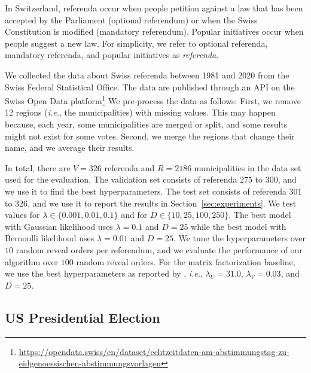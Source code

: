In Switzerland, referenda occur when  people petition against a law that has been accepted by the Parliament (optional referendum) or when the Swiss Constitution is modified (mandatory referendum).
Popular initiatives occur when  people suggest a new law.
For simplicity, we refer to optional referenda, mandatory referenda, and popular initiatives as \textit{referenda}.

We collected the data about Swiss referenda between 1981 and 2020 from the Swiss Federal Statistical Office.
The data are published through an API on the Swiss Open Data platform\footnote{\url{https://opendata.swiss/en/dataset/echtzeitdaten-am-abstimmungstag-zu-eidgenoessischen-abstimmungsvorlagen}}
We pre-process the data as follows:
First, we remove 12 regions (\textit{i.e.}, the municipalities) with missing values.
This may happen because, each year, some municipalities are merged or split, and some results might not exist for some votes.
Second, we merge the regions that change their name, and we average their results.

In total, there are $V=326$ referenda and $R=2186$ municipalities in the data set used for the evaluation.
The validation set consists of referenda $275$ to $300$, and we use it to find the best hyperparameters.
The test set consists of referenda $301$ to $326$, and we use it to report the results in Section~\ref{sec:experiments}.
We test values for $\lambda \in \{0.001, 0.01, 0.1\}$ and for $D \in \{10, 25, 100, 250\}$.
The best model with Gaussian likelihood uses $\lambda=0.1$ and $D=25$ while the best model with Bernoulli likelihood uses $\lambda=0.01$ and $D=25$.
We tune the hyperparameters over $10$ random reveal orders per referendum, and we evaluate the performance of our algorithm over $100$ random reveal orders.
For the matrix factorization baseline, we use the best hyperparameters as reported by \citet{etter2016online}, \textit{i.e.}, $\lambda_U = 31.0$, $\lambda_V = 0.03$, and $D = 25$.

\subsection{US Presidential Election}%
\label{app:us}

